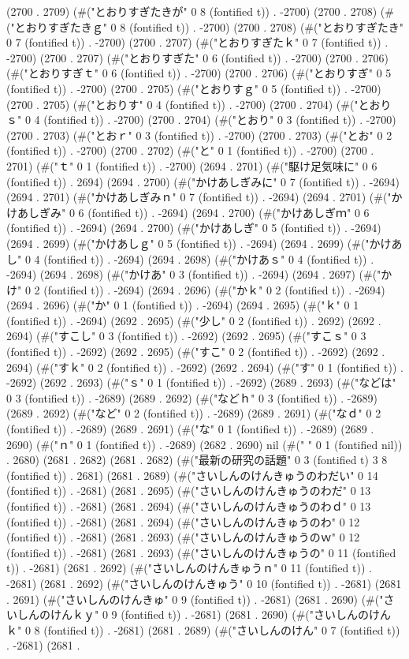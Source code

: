 (2700 . 2709) (#("とおりすぎたきが" 0 8 (fontified t)) . -2700) (2700 . 2708) (#("とおりすぎたきｇ" 0 8 (fontified t)) . -2700) (2700 . 2708) (#("とおりすぎたき" 0 7 (fontified t)) . -2700) (2700 . 2707) (#("とおりすぎたｋ" 0 7 (fontified t)) . -2700) (2700 . 2707) (#("とおりすぎた" 0 6 (fontified t)) . -2700) (2700 . 2706) (#("とおりすぎｔ" 0 6 (fontified t)) . -2700) (2700 . 2706) (#("とおりすぎ" 0 5 (fontified t)) . -2700) (2700 . 2705) (#("とおりすｇ" 0 5 (fontified t)) . -2700) (2700 . 2705) (#("とおりす" 0 4 (fontified t)) . -2700) (2700 . 2704) (#("とおりｓ" 0 4 (fontified t)) . -2700) (2700 . 2704) (#("とおり" 0 3 (fontified t)) . -2700) (2700 . 2703) (#("とおｒ" 0 3 (fontified t)) . -2700) (2700 . 2703) (#("とお" 0 2 (fontified t)) . -2700) (2700 . 2702) (#("と" 0 1 (fontified t)) . -2700) (2700 . 2701) (#("ｔ" 0 1 (fontified t)) . -2700) (2694 . 2701) (#("駆け足気味に" 0 6 (fontified t)) . 2694) (2694 . 2700) (#("かけあしぎみに" 0 7 (fontified t)) . -2694) (2694 . 2701) (#("かけあしぎみｎ" 0 7 (fontified t)) . -2694) (2694 . 2701) (#("かけあしぎみ" 0 6 (fontified t)) . -2694) (2694 . 2700) (#("かけあしぎｍ" 0 6 (fontified t)) . -2694) (2694 . 2700) (#("かけあしぎ" 0 5 (fontified t)) . -2694) (2694 . 2699) (#("かけあしｇ" 0 5 (fontified t)) . -2694) (2694 . 2699) (#("かけあし" 0 4 (fontified t)) . -2694) (2694 . 2698) (#("かけあｓ" 0 4 (fontified t)) . -2694) (2694 . 2698) (#("かけあ" 0 3 (fontified t)) . -2694) (2694 . 2697) (#("かけ" 0 2 (fontified t)) . -2694) (2694 . 2696) (#("かｋ" 0 2 (fontified t)) . -2694) (2694 . 2696) (#("か" 0 1 (fontified t)) . -2694) (2694 . 2695) (#("ｋ" 0 1 (fontified t)) . -2694) (2692 . 2695) (#("少し" 0 2 (fontified t)) . 2692) (2692 . 2694) (#("すこし" 0 3 (fontified t)) . -2692) (2692 . 2695) (#("すこｓ" 0 3 (fontified t)) . -2692) (2692 . 2695) (#("すこ" 0 2 (fontified t)) . -2692) (2692 . 2694) (#("すｋ" 0 2 (fontified t)) . -2692) (2692 . 2694) (#("す" 0 1 (fontified t)) . -2692) (2692 . 2693) (#("ｓ" 0 1 (fontified t)) . -2692) (2689 . 2693) (#("などは" 0 3 (fontified t)) . -2689) (2689 . 2692) (#("などｈ" 0 3 (fontified t)) . -2689) (2689 . 2692) (#("など" 0 2 (fontified t)) . -2689) (2689 . 2691) (#("なｄ" 0 2 (fontified t)) . -2689) (2689 . 2691) (#("な" 0 1 (fontified t)) . -2689) (2689 . 2690) (#("ｎ" 0 1 (fontified t)) . -2689) (2682 . 2690) nil (#(" " 0 1 (fontified nil)) . 2680) (2681 . 2682) (2681 . 2682) (#("最新の研究の話題" 0 3 (fontified t) 3 8 (fontified t)) . 2681) (2681 . 2689) (#("さいしんのけんきゅうのわだい" 0 14 (fontified t)) . -2681) (2681 . 2695) (#("さいしんのけんきゅうのわだ" 0 13 (fontified t)) . -2681) (2681 . 2694) (#("さいしんのけんきゅうのわｄ" 0 13 (fontified t)) . -2681) (2681 . 2694) (#("さいしんのけんきゅうのわ" 0 12 (fontified t)) . -2681) (2681 . 2693) (#("さいしんのけんきゅうのｗ" 0 12 (fontified t)) . -2681) (2681 . 2693) (#("さいしんのけんきゅうの" 0 11 (fontified t)) . -2681) (2681 . 2692) (#("さいしんのけんきゅうｎ" 0 11 (fontified t)) . -2681) (2681 . 2692) (#("さいしんのけんきゅう" 0 10 (fontified t)) . -2681) (2681 . 2691) (#("さいしんのけんきゅ" 0 9 (fontified t)) . -2681) (2681 . 2690) (#("さいしんのけんｋｙ" 0 9 (fontified t)) . -2681) (2681 . 2690) (#("さいしんのけんｋ" 0 8 (fontified t)) . -2681) (2681 . 2689) (#("さいしんのけん" 0 7 (fontified t)) . -2681) (2681 . 